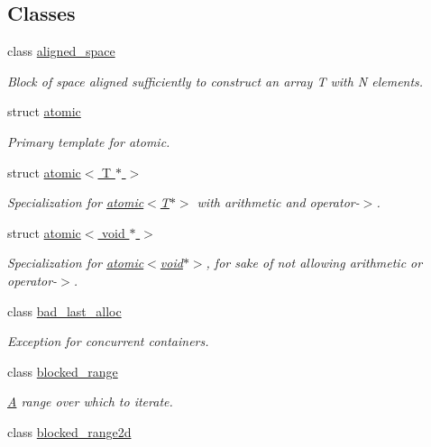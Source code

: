\subsection*{Classes}
\begin{DoxyCompactItemize}
\item 
class \hyperlink{classtbb_1_1aligned__space}{aligned\+\_\+space}
\begin{DoxyCompactList}\small\item\em Block of space aligned sufficiently to construct an array T with N elements. \end{DoxyCompactList}\item 
struct \hyperlink{structtbb_1_1atomic}{atomic}
\begin{DoxyCompactList}\small\item\em Primary template for atomic. \end{DoxyCompactList}\item 
struct \hyperlink{structtbb_1_1atomic_3_01T_01_5_01_4}{atomic$<$ T $\ast$ $>$}
\begin{DoxyCompactList}\small\item\em Specialization for \hyperlink{structtbb_1_1atomic_3_01T_01_5_01_4}{atomic$<$\+T$\ast$$>$} with arithmetic and operator-\/$>$. \end{DoxyCompactList}\item 
struct \hyperlink{structtbb_1_1atomic_3_01void_01_5_01_4}{atomic$<$ void $\ast$ $>$}
\begin{DoxyCompactList}\small\item\em Specialization for \hyperlink{structtbb_1_1atomic_3_01void_01_5_01_4}{atomic$<$void$\ast$$>$}, for sake of not allowing arithmetic or operator-\/$>$. \end{DoxyCompactList}\item 
class \hyperlink{classtbb_1_1bad__last__alloc}{bad\+\_\+last\+\_\+alloc}
\begin{DoxyCompactList}\small\item\em Exception for concurrent containers. \end{DoxyCompactList}\item 
class \hyperlink{classtbb_1_1blocked__range}{blocked\+\_\+range}
\begin{DoxyCompactList}\small\item\em \hyperlink{structA}{A} range over which to iterate. \end{DoxyCompactList}\item 
class \hyperlink{classtbb_1_1blocked__range2d}{blocked\+\_\+range2d}

\end{DoxyCompactItemize}
